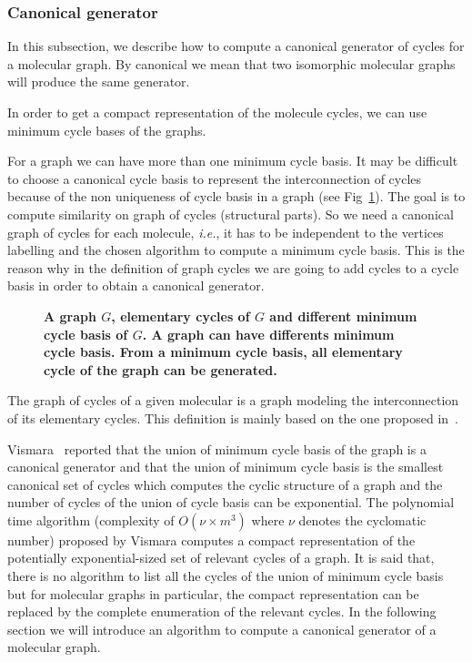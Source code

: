 \documentclass[10pt,letterpaper]{article}
\begin{document}
\subsubsection*{Canonical generator}


In this subsection, we describe how to compute a canonical generator of cycles for a molecular graph. By canonical we mean that two isomorphic molecular graphs will produce the same generator. %


In order to get a compact representation of the molecule cycles, we can use minimum cycle bases\cite{Horton1987} of the graphs. %

For a graph we can have more than one minimum cycle basis. It may be difficult to choose a canonical cycle basis to represent the interconnection of cycles because of the non uniqueness of cycle basis in a graph (see Fig~\ref{fig2}). The goal is to compute similarity on graph of cycles (structural parts). So we need a canonical graph of cycles for each molecule, \textit{i.e.}, it has to be independent to the vertices labelling and the chosen algorithm to compute a minimum cycle basis. This is the reason why in the definition of graph cycles we are going to add cycles to a cycle basis in order to obtain a canonical generator.

\begin{figure}[!h]
	\caption{\bf{A graph $G$, elementary cycles of $G$ and different minimum cycle basis of $G$.} 
	A graph can have differents minimum cycle basis. From a minimum cycle basis, all elementary cycle of the graph can be generated. }
	\label{fig2}
\end{figure}

The {graph of cycles} of a given molecular is a graph  modeling the interconnection of its elementary cycles. This definition is mainly based on the one proposed in~\cite{Vismara2000}.

Vismara~\cite{Vismara1997} reported that the union of minimum cycle basis of the graph is a canonical generator and that the union of minimum cycle basis is the smallest canonical set of cycles which computes the cyclic structure of a graph and the number of cycles of the union of cycle basis can be exponential. The polynomial time algorithm (complexity of $O(\nu \times m^{3})$ where $\nu$ denotes the cyclomatic number) proposed by Vismara computes a compact representation of the potentially exponential-sized set of relevant cycles of a graph. It is said that, there is no algorithm to list all the cycles of the union of minimum cycle basis but for molecular graphs in particular, the compact representation can be replaced by the complete enumeration of the relevant cycles. In the following section we will introduce an algorithm to compute a canonical generator of a molecular graph.
\end{document}
